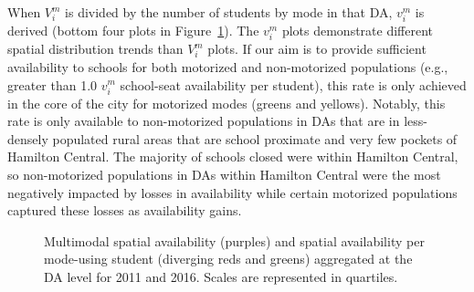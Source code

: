 \documentclass[
default
]{sn-jnl}
\begin{document}
When \(V_i^m\) is divided by the number of students by mode in that DA,
\(v_i^m\) is derived (bottom four plots in Figure~\ref{fig-Fig5}). The
\(v_i^m\) plots demonstrate different spatial distribution trends than
\(V_i^m\) plots. If our aim is to provide sufficient availability to
schools for both motorized and non-motorized populations (e.g., greater
than 1.0 \(v_i^m\) school-seat availability per student), this rate is
only achieved in the core of the city for motorized modes (greens and
yellows). Notably, this rate is only available to non-motorized
populations in DAs that are in less-densely populated rural areas that
are school proximate and very few pockets of Hamilton Central. The
majority of schools closed were within Hamilton Central, so
non-motorized populations in DAs within Hamilton Central were the most
negatively impacted by losses in availability while certain motorized
populations captured these losses as availability gains.

\begin{figure}[H]


\caption{\label{fig-Fig5}Multimodal spatial availability (purples) and
spatial availability per mode-using student (diverging reds and greens)
aggregated at the DA level for 2011 and 2016. Scales are represented in
quartiles.}

\end{figure}%
\end{document}
